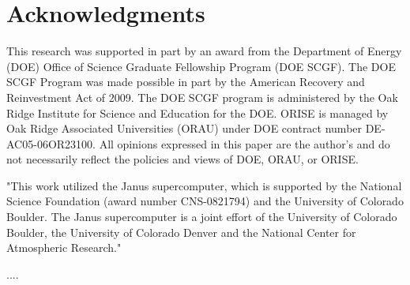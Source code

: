 \documentclass{PoS}
\begin{document}
\section{Acknowledgments}
This research was supported in part by an award from the Department of Energy (DOE) Office of Science Graduate Fellowship Program (DOE SCGF). The DOE SCGF Program was made possible in part by the American Recovery and Reinvestment Act of 2009.  The DOE SCGF program is administered by the Oak Ridge Institute for Science and Education for the DOE. ORISE is managed by Oak Ridge Associated Universities (ORAU) under DOE contract number DE-AC05-06OR23100.  All opinions expressed in this paper are the author's and do not necessarily reflect the policies and views of DOE, ORAU, or ORISE.

"This work utilized the Janus supercomputer, which is supported by the National Science Foundation (award number CNS-0821794) and the University of Colorado Boulder. The Janus supercomputer is a joint effort of the University of Colorado Boulder, the University of Colorado Denver and the National Center for Atmospheric Research."

\begin{thebibliography}{99}
   ....
\end{thebibliography}
\end{document}
